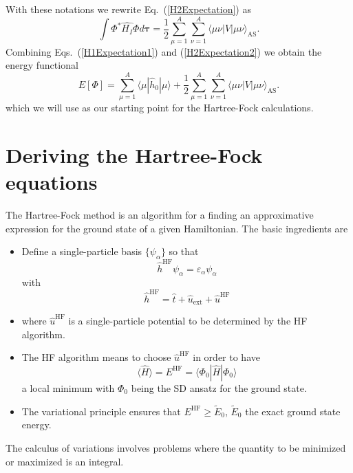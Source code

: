 With these notations we rewrite Eq.~(\ref{H2Expectation}) as
\begin{equation}
  \int \Phi^*\hat{H_I}\Phi d\mathbf{\tau} =
  \frac{1}{2}\sum_{\mu=1}^A\sum_{\nu=1}^A \langle
  \mu\nu|V|\mu\nu\rangle_{\mathrm{AS}}.
\label{H2Expectation2}
\end{equation}
Combining Eqs.~(\ref{H1Expectation1}) and (\ref{H2Expectation2}) we
obtain the energy functional
\begin{equation}
  E[\Phi] = \sum_{\mu=1}^A \langle \mu | \hat{h}_0 | \mu \rangle +
  \frac{1}{2}\sum_{{\mu}=1}^A\sum_{{\nu}=1}^A \langle
  \mu\nu|V|\mu\nu\rangle_{\mathrm{AS}}.
\label{FunctionalEPhi}
\end{equation}
which we will use as our starting point for the Hartree-Fock
calculations.


\section{Deriving the Hartree-Fock equations}

The Hartree-Fock method is an algorithm for a finding an approximative expression
for the ground state of a given Hamiltonian. The basic ingredients are
\begin{itemize}
\item Define a single-particle basis $\{\psi_{\alpha}\}$ so that
\[ \hat{h}^{\mathrm{HF}}\psi_{\alpha} = \varepsilon_{\alpha}\psi_{\alpha}\]
with
\[
\hat{h}^{\mathrm{HF}}=\hat{t}+\hat{u}_{\mathrm{ext}}+\hat{u}^{\mathrm{HF}}
\]
\item where $\hat{u}^{\mathrm{HF}}$ is a single-particle potential to
  be determined by the HF algorithm.
\item The HF algorithm means to choose $\hat{u}^{\mathrm{HF}}$ in
  order to have
\[ \langle \hat{H} \rangle = E^{\mathrm{HF}}= \langle \Phi_0 | \hat{H}|\Phi_0 \rangle\]
a local minimum with $\Phi_0$ being the SD ansatz for the ground
state.
\item The variational principle ensures that $E^{\mathrm{HF}} \ge
  \tilde{E}_0$, $\tilde{E}_0$ the exact ground state energy.
\end{itemize}

The calculus of variations involves problems where the quantity to be
minimized or maximized is an integral.

